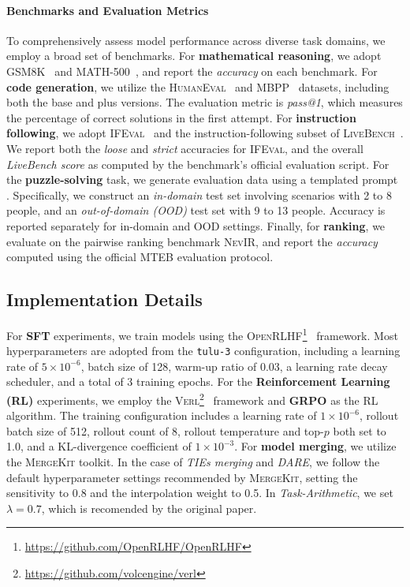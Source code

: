 \documentclass{article} %
\begin{document}
\paragraph{Benchmarks and Evaluation Metrics} 
To comprehensively assess model performance across diverse task domains, we employ a broad set of benchmarks. 
For \textbf{mathematical reasoning}, we adopt \textsc{GSM8K}~\citep{cobbe2021training} and \textsc{MATH-500}~\citep{hendrycks2021measuring,lightman2023let}, and report the \emph{accuracy} on each benchmark.
For \textbf{code generation}, we utilize the \textsc{HumanEval}~\citep{chen2021evaluating} and \textsc{MBPP}~\citep{austin2021program} datasets, including both the base and plus versions. The evaluation metric is \emph{pass@1}, which measures the percentage of correct solutions in the first attempt.
For \textbf{instruction following}, we adopt \textsc{IFEval}~\citep{zhou2023instruction} and the instruction-following subset of \textsc{LiveBench}~\citep{white2024livebench}. We report both the \emph{loose} and \emph{strict} accuracies for \textsc{IFEval}, and the overall \emph{LiveBench score} as computed by the benchmark's official evaluation script.
For the \textbf{puzzle-solving} task, we generate evaluation data using a templated prompt . Specifically, we construct an \emph{in-domain} test set involving scenarios with 2 to 8 people, and an \emph{out-of-domain (OOD)} test set with 9 to 13 people. Accuracy is reported separately for in-domain and OOD settings.
Finally, for \textbf{ranking}, we evaluate on the pairwise ranking benchmark \textsc{NevIR}, and report the \emph{accuracy} computed using the official \textsc{MTEB} evaluation protocol.

\subsection{Implementation Details}
For \textbf{SFT} experiments, we train models using the \textsc{OpenRLHF}\footnote{\url{https://github.com/OpenRLHF/OpenRLHF}}~\citep{hu2024openrlhf} framework. Most hyperparameters are adopted from the \texttt{tulu-3} configuration, including a learning rate of $5 \times 10^{-6}$, batch size of 128, warm-up ratio of 0.03, a learning rate decay scheduler, and a total of 3 training epochs.
For the \textbf{Reinforcement Learning (RL)} experiments, we employ the \textsc{Verl}\footnote{\url{https://github.com/volcengine/verl}}~\citep{sheng2024hybridflow} framework and \textbf{GRPO} as the RL algorithm. The training configuration includes a learning rate of $1 \times 10^{-6}$, rollout batch size of 512, rollout count of 8, rollout temperature and top-$p$ both set to 1.0, and a KL-divergence coefficient of $1 \times 10^{-3}$.
For \textbf{model merging}, we utilize the \textsc{MergeKit} toolkit. In the case of \emph{TIEs merging} and \emph{DARE}, we follow the default hyperparameter settings recommended by \textsc{MergeKit}, setting the sensitivity to 0.8 and the interpolation weight to 0.5. In \emph{Task-Arithmetic}, we set $\lambda=0.7$, which is recomended by the original paper.
\end{document}
